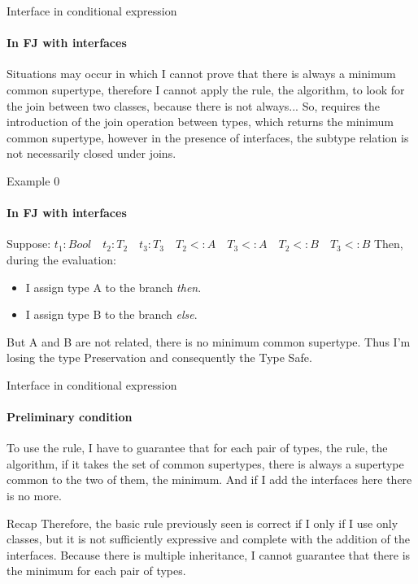 \documentclass{beamer}
\begin{document}
\begin{frame}{Interface in conditional expression}
    \framesubtitle{In FJ with interfaces}
    Situations may occur in which I cannot prove that there is always a minimum common supertype, therefore I cannot apply the rule, the algorithm, to look for the join between two classes, because there is not always...\newline
 So, requires the introduction of the join operation between types, which returns the minimum common supertype, however in the presence of interfaces, the subtype relation is not necessarily closed under joins. 
\end{frame}

\begin{frame}{Example 0}
    \framesubtitle{In FJ with interfaces}
Suppose: $t_1 : Bool \quad t_2 : T_2 \quad t_3 : T_3 \quad T_2 <:A \quad T_3 <: A \quad T_2 <: B \quad T_3 <: B$
Then, during the evaluation:
\begin{itemize}
    \item I assign type A to the branch \textit{then}.
    \item I assign type B to the branch \textit{else}.
\end{itemize}
But A and B are not related, there is no minimum common supertype. Thus I'm losing the type Preservation and consequently the Type Safe.

\begin{center}
\end{center}
 \end{frame}

\begin{frame}{Interface in conditional expression}
\framesubtitle{Preliminary condition}
    To use the rule, I have to guarantee that for each pair of types, the rule, the algorithm, if it takes the set of common supertypes, there is always a supertype common to the two of them, the minimum.\newline
And if I add the interfaces here there is no more.
\end{frame}
\begin{frame}{Recap}
Therefore, the basic rule previously seen is correct if I only if I use only classes, but it is not sufficiently expressive and complete with the addition of the interfaces.\newline\newline
Because there is multiple inheritance, I cannot guarantee that there is the minimum for each pair of types.
    
\end{frame}
\end{document}
